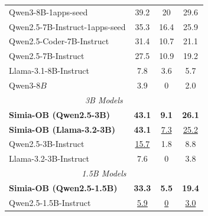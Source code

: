 \begin{table}
{\begin{tabular}{l|ccc}
            Qwen3-8B-1apps-seed & 39.2 & 20 & 29.6 \\
            Qwen2.5-7B-Instruct-1apps-seed & 35.3 & 16.4 & 25.9 \\
            Qwen2.5-Coder-7B-Instruct & 31.4 & 10.7 & 21.1 \\
            Qwen2.5-7B-Instruct & 27.5 & 10.9 & 19.2 \\
            Llama-3.1-8B-Instruct & 7.8 & 3.6 & 5.7 \\
            Qwen3-$8B$ & 3.9 & 0 & 2.0 \\
            \midrule
            \multicolumn{4}{c}{\textit{3B Models}} \\
            \midrule
            \rowcolor{lightblue}
            \textbf{\textcolor{ourmodel}{Simia-OB (Qwen2.5-3B)}} & \textbf{43.1} & \textbf{9.1} & \textbf{26.1} \\
            \rowcolor{lightblue}
            \textbf{\textcolor{ourmodel}{Simia-OB (Llama-3.2-3B)}} & \textbf{43.1} & \underline{7.3} & \underline{25.2} \\
            Qwen2.5-3B-Instruct & \underline{15.7} & 1.8 & 8.8 \\
            Llama-3.2-3B-Instruct & 7.6 & 0 & 3.8 \\
            \midrule
            \multicolumn{4}{c}{\textit{1.5B Models}} \\
            \midrule
            \rowcolor{lightblue}
            \textbf{\textcolor{ourmodel}{Simia-OB (Qwen2.5-1.5B)}} & \textbf{33.3} & \textbf{5.5} & \textbf{19.4} \\
            Qwen2.5-1.5B-Instruct & \underline{5.9} & \underline{0} & \underline{3.0} \\
            \bottomrule
        \end{tabular}
    }
\end{table}